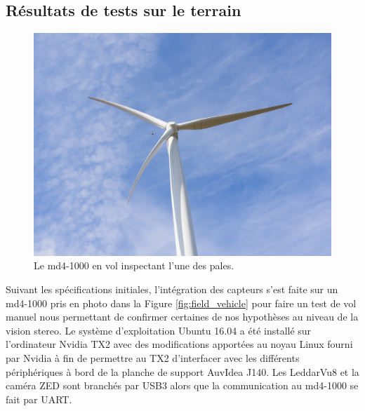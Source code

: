 \clearpage
\subsection{Résultats de tests sur le terrain}
\label{subsec:results_field}

\begin{figure}[htb]
  \centering
  \includegraphics[trim=180 200 180 180,clip,width=\linewidth]{images/test_eolienne.jpg}
  \caption{Le md4-1000 en vol inspectant l'une des pales.}
  \label{fig:test_eolienne}
\end{figure}

Suivant les spécifications initiales, l'intégration des capteurs s'est faite sur un md4-1000 pris en photo dans la Figure \ref{fig:field_vehicle} pour faire un test de vol manuel nous permettant de confirmer certaines de nos hypothèses au niveau de la vision stereo. Le système d'exploitation Ubuntu 16.04 a été installé sur l'ordinateur Nvidia TX2 avec des modifications apportées au noyau Linux fourni par Nvidia à fin de permettre au TX2 d'interfacer avec les différents périphériques à bord de la planche de support AuvIdea J140. Les LeddarVu8 et la caméra ZED sont branchés par USB3 alors que la communication au md4-1000 se fait par UART.

